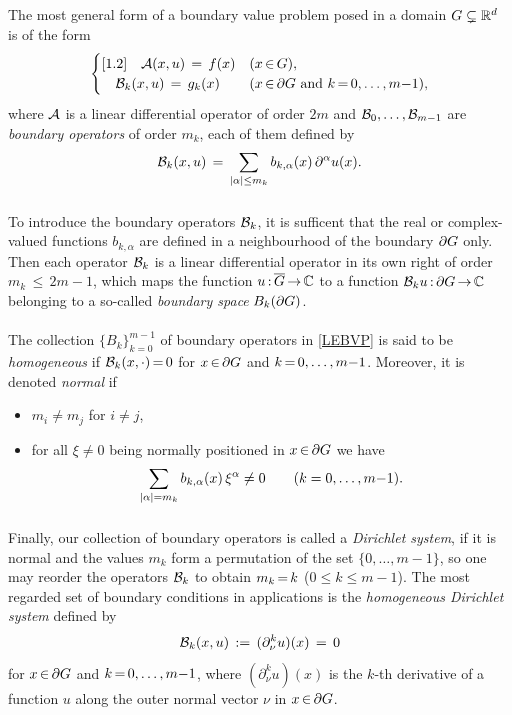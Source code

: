 \documentclass[11pt,twoside]{article}
\def\G{G}
\begin{document}
\subparagraph{} %
The most general form of a boundary value problem
posed in a domain $\G \subsetneq \Rd$ is of the form
\begin{equation}\label{LEBVP}
\begin{cases}[1.2]
\quad \A(x,u)     \= f(x)   & (x \xeof \G),\\
\quad \BDO_k(x,u) \= g_k(x) & (x \xeof \bndG \and k \eq 0,\ldots,m{-}1),\\
\end{cases}
\end{equation}
where ${\mathcal{A}}$ is a {linear} differential operator of order $2m$
and ${\mathcal{B}}_0,\ldots,{\mathcal{B}}_{m-1}$ are \textit{boundary operators} of order $m_k$,
each of them defined by
\[
\BDO_k(x,u) \=
\sum_{\abs{\alpha} \leq m_k} b_{k,\alpha}(x) \, \PA u(x).
\]

\subparagraph{}
To introduce the boundary operators ${\mathcal{B}}_k$,
it is sufficent
that the real or complex-valued functions $b_{k,\alpha}$
are defined in a neighbourhood of the boundary $\bndG$ only.
Then each operator ${\mathcal{B}}_k$ is a linear differential operator in its own right
of order $m_k {\,\leq\,} 2m{-}1$,
which maps the function $u \: \clG \xto \C$
to a function $\BDO_k u \: \bndG \xto \C$
belonging to a so-called \textit{boundary space} $B_k(\bndG)$.

\paragraph{} %
The collection $\{B_k\}_{k=0}^{m-1}$ of boundary operators in \eqref{LEBVP}
is said to be \textit{homogeneous}
if ${\mathcal{B}}_k(x,\cdot) {\,=\,} 0$ for $x \xeof \bndG$ and $k {\,=\,} 0,\ldots,m{-}1$.
Moreover,
it is denoted \textit{normal} if

\begin{itemize}[leftmargin=15mm,itemsep=2pt]
\item[(B-1)]
$m_i \neq m_j$ for $i \neq j$,

\item[(B-2)]
for all $\xi \neq 0$ being normally positioned in $x \xeof \bndG$
we have
\[
\sum_{\abs{\alpha} = m_k} b_{k,\alpha}(x) \, \xi^{\alpha} \neq 0
\quad \quad (k=0,\ldots,m{-}1).
\]
\end{itemize}

\subparagraph{} %
Finally,
our collection of boundary operators is called a \textit{Dirichlet system},
if it is normal and the values $m_k$ form a permutation
of the set $\{0,\ldots,m{-}1\}$,
so one may reorder the operators ${\mathcal{B}}_k$ to obtain $m_k {\,=\,} k$
($0 \leq k \leq m{-}1$).
The most regarded set of boundary conditions in applications
is the \textit{homogeneous Dirichlet system} defined by
\begin{equation}\label{HOMOGENEOUS_DIRICHLET_SYSTEM}
{\mathcal{B}}_k(x,u) \,:=\, (\partial_{\nu}^k u)(x) \,=\, 0
\end{equation}
for $x \xeof \bndG$ and $k {\,=\,} 0,\ldots,m{-}1$,
where $(\partial_{\nu}^k u)(x)$ is the $k$-th derivative of a function $u$
along the outer normal vector $\nu$ in $x \xeof \bndG$.
\end{document}
